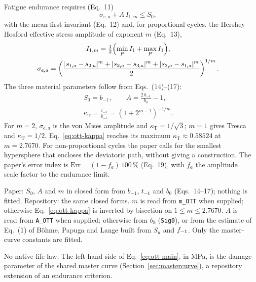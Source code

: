  Fatigue endurance requires (Eq.~11)
\begin{equation}
\sigma_{e,a} + A\,I_{1,m} \le S_0 ,
\label{eq:ott-main}
\end{equation}
with the mean first invariant (Eq.~12) and, for proportional cycles, the Hershey--Hosford effective
stress amplitude of exponent $m$ (Eq.~13),
\begin{gather}
I_{1,m} = \tfrac12\Bigl(\min_P I_1 + \max_P I_1\Bigr) , \label{eq:ott-i1m}\\
\sigma_{e,a} = \left(\frac{|s_{1,a}-s_{2,a}|^m + |s_{2,a}-s_{3,a}|^m + |s_{3,a}-s_{1,a}|^m}{2}\right)^{1/m} .
\label{eq:ott-se}
\end{gather}
The three material parameters follow from Eqs.~(14)--(17):
\begin{gather}
S_0 = b_{-1}, \qquad A = \frac{2\,b_{-1}}{b_0} - 1 , \label{eq:ott-const}\\
\kappa_{\mathrm{T}} = \frac{t_{-1}}{b_{-1}} = \left(1 + 2^{m-1}\right)^{-1/m} . \label{eq:ott-kappa}
\end{gather}
For $m=2$, $\sigma_{e,a}$ is the von Mises amplitude and $\kappa_{\mathrm{T}}=1/\sqrt3$; $m=1$ gives
Tresca and $\kappa_{\mathrm{T}}=1/2$. Eq.~\eqref{eq:ott-kappa} reaches its maximum
$\kappa_{\mathrm{T}}\approx0.58524$ at $m=2.7670$. For non-proportional cycles the paper calls for
the smallest hypersphere that encloses the deviatoric path, without giving a construction. The
paper's error index is $\mathrm{Err}=(1-f_a)\,100\,\%$ (Eq.~19), with $f_a$ the amplitude scale
factor to the endurance limit.

 Paper: $S_0$, $A$ and $m$ in closed form from $b_{-1}$, $t_{-1}$
and $b_0$ (Eqs.~14--17); nothing is fitted. Repository: the same closed forms. $m$ is read from
\texttt{m\_OTT} when supplied; otherwise Eq.~\eqref{eq:ott-kappa} is inverted by bisection on
$1\le m\le2.7670$. $A$ is read from \texttt{A\_OTT} when supplied; otherwise from $b_0$
(\texttt{Sig0}), or from the estimate of Eq.~(1) of B\"ohme, Papuga and Lange \cite{bohme2026} built
from $S_u$ and $f_{-1}$. Only the master-curve constants are fitted.

 No native life law. The left-hand side of Eq.~\eqref{eq:ott-main}, in MPa, is the
damage parameter of the shared master curve (Section~\ref{sec:mastercurve}), a repository
extension of an endurance criterion.

